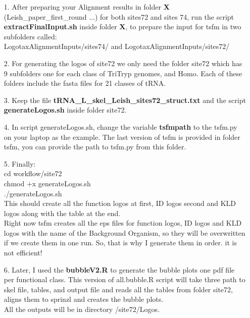 \documentclass[table,
12pt, %
a4paper, %
oneside, %
headinclude,footinclude, %
BCOR5mm, %
]{scrartcl}
\begin{document}
\begin{itemize}
\item[1. ] After preparing your Alignment results in folder \textbf{X }(Leish\_paper\_first\_round ...) for both sites72 and sites 74, run the script \textbf{extractFinalInput.sh} inside folder \textbf{X}, to prepare the input for tsfm in two subfolders called:\\
LogotaxAlignmentInputs/sites74/ and LogotaxAlignmentInputs/sites72/ \\
\item[2. ] For generating the logos of site72 we only need the folder site72 which has 9 subfolders one for each class of TriTryp genomes, and Homo. Each of these folders include the fasta files for 21 classes of tRNA.\\
\item[3. ] Keep the file \textbf{tRNA\_L\_skel\_Leish\_sites72\_struct.txt} and the script \textbf{generateLogos.sh} inside folder site72.\\
\item[4. ] In script generateLogos.sh, change the variable \textbf{tsfmpath} to the tsfm.py on your laptop as the example. The last version of tsfm is provided in folder tsfm, you can provide the path to tsfm.py from this folder.\\
\item[5. ] Finally:\\
cd workflow/site72\\
chmod +x generateLogos.sh\\
./generateLogos.sh\\
This should create all the function logos at first, ID logos second and KLD logos along with the table at the end.\\
Right now tsfm creates all the eps files for function logos, ID logos and KLD logos with the name of the Background Organism, so they will be overwritten if we create them in one run. So, that is why I generate them in order. it is not efficient! \\
\item[6. ] Later, I used the \textbf{bubbleV2.R} to generate the bubble plots one pdf file per functional class. This version of all.bubble.R script will take three path to skel file, tables, and output file and reads all the tables from folder site72, aligns them to sprinzl and creates the bubble plots.\\
All the outputs will be in directory /site72/Logos.\\
\end{itemize}
 
        
\renewcommand{\refname}{\spacedlowsmallcaps{References}} %

\end{document}
